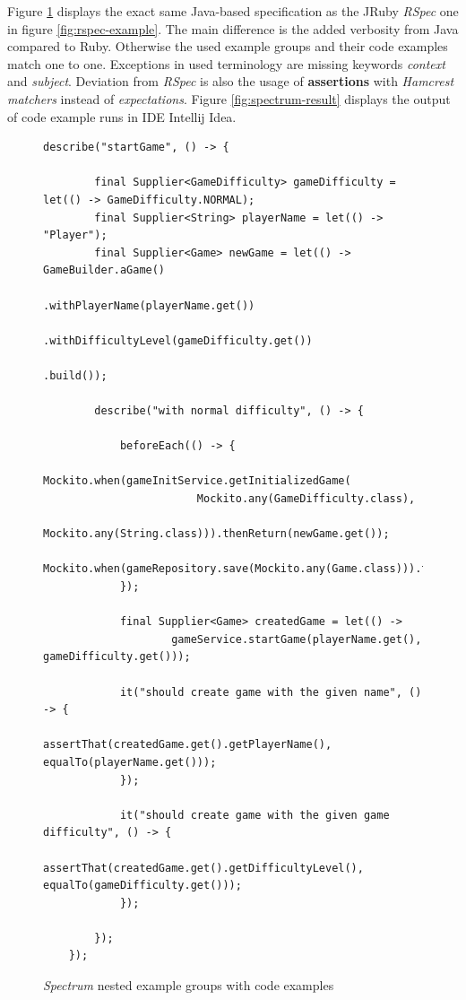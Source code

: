     Figure \ref{fig:spectrum-example} displays the exact same Java-based specification as the JRuby \textit{RSpec} one in figure \ref{fig:rspec-example}.
    The main difference is the added verbosity from Java compared to Ruby. Otherwise the used example groups and their code examples
    match one to one. Exceptions in used terminology are missing keywords \textit{context} and \textit{subject}.
    Deviation from \textit{RSpec} is also the usage of \textbf{assertions} with \textit{Hamcrest matchers} instead of \textit{expectations}.
    Figure \ref{fig:spectrum-result}
    displays the output of code example runs in IDE Intellij Idea.

    \begin{figure}[H]
    \begin{lstlisting}[style=java]
    describe("startGame", () -> {

        final Supplier<GameDifficulty> gameDifficulty = let(() -> GameDifficulty.NORMAL);
        final Supplier<String> playerName = let(() -> "Player");
        final Supplier<Game> newGame = let(() -> GameBuilder.aGame()
                                                    .withPlayerName(playerName.get())
                                                    .withDifficultyLevel(gameDifficulty.get())
                                                    .build());

        describe("with normal difficulty", () -> {

            beforeEach(() -> {
                Mockito.when(gameInitService.getInitializedGame(
                        Mockito.any(GameDifficulty.class),
                        Mockito.any(String.class))).thenReturn(newGame.get());
                Mockito.when(gameRepository.save(Mockito.any(Game.class))).thenReturn(newGame.get());
            });

            final Supplier<Game> createdGame = let(() ->
                    gameService.startGame(playerName.get(), gameDifficulty.get()));

            it("should create game with the given name", () -> {
                assertThat(createdGame.get().getPlayerName(), equalTo(playerName.get()));
            });

            it("should create game with the given game difficulty", () -> {
                assertThat(createdGame.get().getDifficultyLevel(), equalTo(gameDifficulty.get()));
            });

        });
    });
    \end{lstlisting}
        \caption{\textit{Spectrum} nested example groups with code examples}
        \label{fig:spectrum-example}

    \end{figure}

